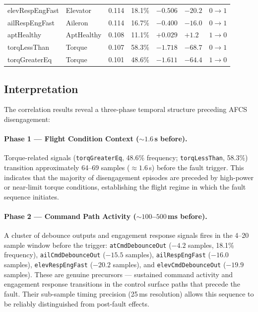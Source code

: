 \documentclass[11pt, letterpaper]{article}
\begin{document}
\begin{table}[h]
\begin{tabular}{@{}L{3.8cm} L{2.8cm} R{1.0cm} R{1.3cm} R{1.4cm} R{1.6cm} L{1.6cm}@{}}
elevRespEngFast   & Elevator     & 0.114 & 18.1\% & $-0.506$ & $-20.2$ & $0\!\to\!1$ \\
ailRespEngFast    & Aileron      & 0.114 & 16.7\% & $-0.400$ & $-16.0$ & $0\!\to\!1$ \\
aptHealthy        & AptHealthy   & 0.108 & 11.1\% & $+0.029$ & $+1.2$ & $1\!\to\!0$ \\
torqLessThan      & Torque       & 0.107 & 58.3\% & $-1.718$ & $-68.7$ & $0\!\to\!1$ \\
torqGreaterEq     & Torque       & 0.101 & 48.6\% & $-1.611$ & $-64.4$ & $1\!\to\!0$ \\
\bottomrule
\end{tabular}
\end{table}

\subsection{Interpretation}

The correlation results reveal a three-phase temporal structure preceding AFCS
disengagement:

\paragraph{Phase 1 --- Flight Condition Context ($\sim\!1.6$\,s before).}
Torque-related signals (\texttt{torqGreaterEq}, 48.6\% frequency;
\texttt{torqLessThan}, 58.3\%) transition approximately 64--69 samples
($\approx\!1.6$\,s) before the fault trigger. This indicates that the majority
of disengagement episodes are preceded by high-power or near-limit torque
conditions, establishing the flight regime in which the fault sequence initiates.

\paragraph{Phase 2 --- Command Path Activity ($\sim\!100$--$500$\,ms before).}
A cluster of debounce outputs and engagement response signals fires in the 4--20
sample window before the trigger:
\texttt{atCmdDebounceOut} ($-4.2$ samples, 18.1\% frequency),
\texttt{ailCmdDebounceOut} ($-15.5$ samples),
\texttt{ailRespEngFast} ($-16.0$ samples),
\texttt{elevRespEngFast} ($-20.2$ samples), and
\texttt{elevCmdDebounceOut} ($-19.9$ samples).
These are genuine precursors --- sustained command activity and engagement
response transitions in the control surface paths that precede the fault.
Their sub-sample timing precision (25\,ms resolution) allows this sequence to
be reliably distinguished from post-fault effects.
\end{document}
